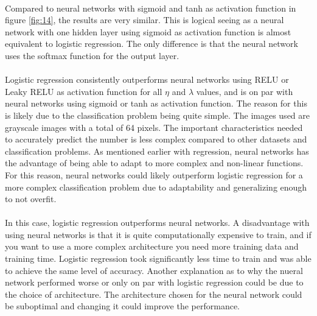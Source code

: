 \documentclass[a4paper,twocolumn]{article}
\begin{document}
\\
Compared to neural networks with sigmoid and tanh as activation function in figure \ref{fig:14}, the results are very similar. This is logical seeing as a neural network with one hidden layer using sigmoid as activation function is almost equivalent to logistic regression. The only difference is that the neural network uses the softmax function for the output layer.\\
\\
Logistic regression consistently outperforms neural networks using RELU or Leaky RELU as activation function for all $\eta$ and $\lambda$ values, and is on par with neural networks using sigmoid or tanh as activation function. The reason for this is likely due to the classification problem being quite simple. The images used are grayscale images with a total of 64 pixels. The important characteristics needed to accurately predict the number is less complex compared to other datasets and classification problems. As mentioned earlier with regression, neural networks has the advantage of being able to adapt to more complex and non-linear functions. For this reason, neural networks could likely outperform logistic regression for a more complex classification problem due to adaptability and generalizing enough to not overfit.\\
\\
In this case, logistic regression outperforms neural networks. A disadvantage with using neural networks is that it is quite computationally expensive to train, and if you want to use a more complex architecture you need more training data and training time. Logistic regression took significantly less time to train and was able to achieve the same level of accuracy. Another explanation as to why the nueral network performed worse or only on par with logistic regression could be due to the choice of architecture. The architecture chosen for the neural network could be suboptimal and changing it could improve the performance. 
\end{document}
